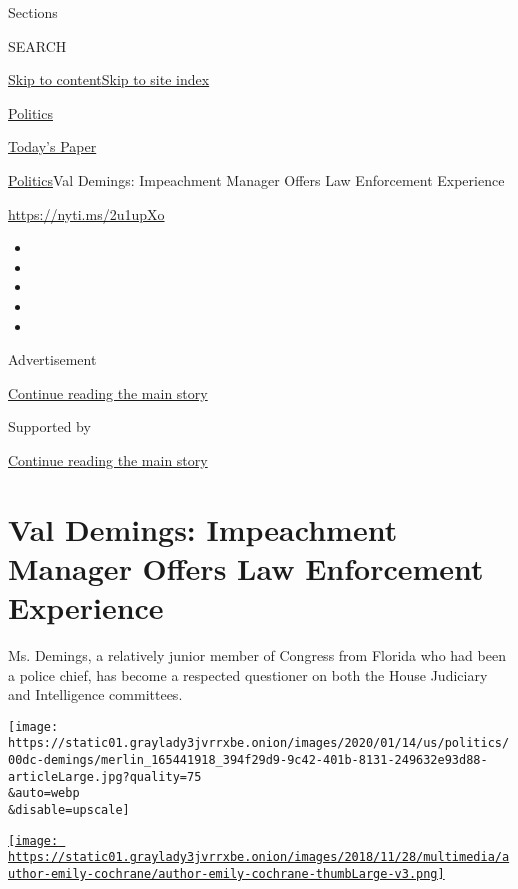 Sections

SEARCH

\protect\hyperlink{site-content}{Skip to
content}\protect\hyperlink{site-index}{Skip to site index}

\href{https://www.nytimes3xbfgragh.onion/section/politics}{Politics}

\href{https://myaccount.nytimes3xbfgragh.onion/auth/login?response_type=cookie\&client_id=vi}{}

\href{https://www.nytimes3xbfgragh.onion/section/todayspaper}{Today's
Paper}

\href{/section/politics}{Politics}\textbar{}Val Demings: Impeachment
Manager Offers Law Enforcement Experience

\href{https://nyti.ms/2u1upXo}{https://nyti.ms/2u1upXo}

\begin{itemize}
\item
\item
\item
\item
\item
\end{itemize}

Advertisement

\protect\hyperlink{after-top}{Continue reading the main story}

Supported by

\protect\hyperlink{after-sponsor}{Continue reading the main story}

\hypertarget{val-demings-impeachment-manager-offers-law-enforcement-experience}{%
\section{Val Demings: Impeachment Manager Offers Law Enforcement
Experience}\label{val-demings-impeachment-manager-offers-law-enforcement-experience}}

Ms. Demings, a relatively junior member of Congress from Florida who had
been a police chief, has become a respected questioner on both the House
Judiciary and Intelligence committees.

\texttt{[image: https://static01.graylady3jvrrxbe.onion/images/2020/01/14/us/politics/00dc-demings/merlin\_165441918\_394f29d9-9c42-401b-8131-249632e93d88-articleLarge.jpg?quality=75\\\&auto=webp\\\&disable=upscale]}

\href{https://www.nytimes3xbfgragh.onion/by/emily-cochrane}{\texttt{[image: https://static01.graylady3jvrrxbe.onion/images/2018/11/28/multimedia/author-emily-cochrane/author-emily-cochrane-thumbLarge-v3.png]}}

